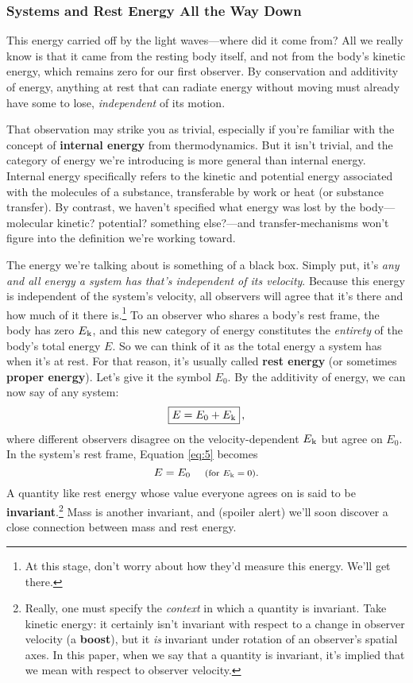 \documentclass[12pt]{article}
\begin{document}
\subsubsection{Systems and Rest Energy All the Way Down}\label{sssec:sy}

This energy carried off by the light waves---where did it come from? All we really know is that it came from the resting body itself, and not from the body's kinetic energy, which remains zero for our first observer. By conservation and additivity of energy, anything at rest that can radiate energy without moving must already have some to lose, \emph{independent} of its motion.

That observation may strike you as trivial, especially if you're familiar with the concept of \textbf{internal energy} from thermodynamics. But it isn't trivial, and the category of energy we're introducing is more general than internal energy. Internal energy specifically refers to the kinetic and potential energy associated with the molecules of a substance, transferable by work or heat (or substance transfer). By contrast, we haven't specified what energy was lost by the body---molecular kinetic? potential? something else?---and transfer-mechanisms won't figure into the definition we're working toward.

The energy we're talking about is something of a black box. Simply put, it's \emph{any and all energy a system has that's independent of its velocity}. Because this energy is independent of the system's velocity, all observers will agree that it's there and how much of it there is.\footnote{\label{fn:re}At this stage, don't worry about how they'd measure this energy. We'll get there.} To an observer who shares a body's rest frame, the body has zero $E_{\mkern.5mu \textrm{k}}$, and this new category of energy constitutes the \emph{entirety} of the body's total energy $E$. So we can think of it as the total energy a system has when it's at rest. For that reason, it's usually called \textbf{rest energy} (or sometimes \textbf{proper energy}). Let's give it the symbol $E_0$. By the additivity of energy, we can now say of any system:
\begin{equation}\label{eq:5}
\boxed{E=E_0+E_{\mkern.5mu \textrm{k}}} \, ,
\end{equation}
where different observers disagree on the velocity-dependent $E_{\mkern.5mu \textrm{k}}$ but agree on $E_0$. In the system's rest frame, Equation \ref{eq:5} becomes
\begin{equation}\label{eq:6}
E=E_0 \quad \textrm{\footnotesize{ (for $E_{\mkern.5mu \textrm{k}}=0$)}}.
\end{equation}
A quantity like rest energy whose value everyone agrees on is said to be \textbf{invariant}.\footnote{\label{fn:inv}Really, one must specify the \emph{context} in which a quantity is invariant. Take kinetic energy: it certainly isn't invariant with respect to a change in observer velocity (a \textbf{boost}), but it \emph{is} invariant under rotation of an observer's spatial axes. In this paper, when we say that a quantity is invariant, it's implied that we mean with respect to observer velocity.} Mass is another invariant, and (spoiler alert) we'll soon discover a close connection between mass and rest energy.
\end{document}
